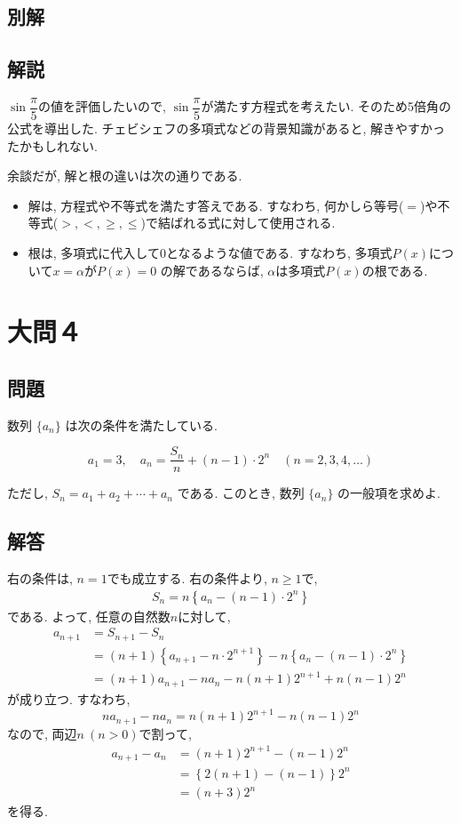\documentclass[dvipdfmx,a4paper]{jsarticle}
\newcommand{\2}{I\hspace{-1pt}I}
\newcommand{\3}{I\hspace{-1pt}I\hspace{-1pt}I}
\begin{document}
    \subsection{別解}

    \subsection{解説}
    $\sin \dfrac{\pi}{5}$の値を評価したいので, $\sin \dfrac{\pi}{5}$が満たす方程式を考えたい. 
    そのため5倍角の公式を導出した. チェビシェフの多項式などの背景知識があると, 解きやすかったかもしれない. 

    余談だが, 解と根の違いは次の通りである. 
    \begin{itemize}
        \item 解は, 方程式や不等式を満たす答えである. すなわち, 何かしら等号($=$)や不等式($>,<,\geq, \leq$)で結ばれる式に対して使用される. 
        \item 根は, 多項式に代入して0となるような値である. すなわち, 多項式$P(x)$について$x=\alpha$が$P(x)=0$
        の解であるならば, $\alpha$は多項式$P(x)$の根である. 

    \end{itemize}

    \section{大問４}
    \subsection{問題}
    数列 $\{a_n\}$ は次の条件を満たしている. 

    \[
    a_1 = 3, \quad a_n = \frac{S_n}{n} + (n-1) \cdot 2^n \quad (n = 2, 3, 4, \ldots)
    \]

    ただし, $S_n = a_1 + a_2 + \cdots + a_n$ である. このとき, 数列 $\{a_n\}$ の一般項を求めよ. 
    \subsection{解答}
    右の条件は, $n=1$でも成立する. 右の条件より, $n\geq 1$で, 
    \begin{align*}
        S_n = n\left\{a_n -(n-1)\cdot 2^n\right\}
    \end{align*}
    である. よって, 任意の自然数$n$に対して, 
    \begin{align*}
        a_{n+1} &= S_{n+1} - S_n \\
                &= (n+1)\left\{a_{n+1} -n\cdot 2^{n+1}\right\} - n\left\{a_n -(n-1)\cdot 2^n\right\} \\
                &= (n+1)a_{n+1} - na_n -n(n+1)2^{n+1} + n(n-1)2^n
    \end{align*}
    が成り立つ. すなわち, 
    \[
        na_{n+1} - na_n = n(n+1)2^{n+1} - n(n-1)2^n
    \]
    なので, 両辺$n\ (n>0)$で割って, 
    \begin{align*}
        a_{n+1} - a_n &= (n+1)2^{n+1} - (n-1)2^n \\
        &= \left\{2(n+1)-(n-1)\right\}2^n \\
        &= (n+3)2^n
    \end{align*}
    を得る. 
\end{document}
